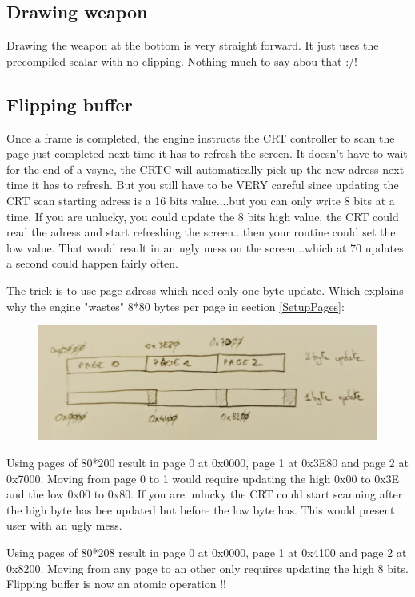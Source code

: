 \subsection{Drawing weapon}
Drawing the weapon at the bottom is very straight forward. It just uses the precompiled scalar with no clipping. Nothing much to say abou that :/!\\






\subsection{Flipping buffer} \label{Flippingbuffer}
Once a frame is completed, the engine instructs the CRT controller to scan the page just completed next time it has to refresh the screen. It doesn't have to wait for the end of a vsync, the CRTC will automatically pick up the new adress next time it has to refresh. But you still have to be VERY careful since updating the CRT scan starting adress is a 16 bits value....but you can only write 8 bits at a time. If you are unlucky, you could update the 8 bits high value, the CRT could read the adress and start refreshing the screen...then your routine could set the low value. That would result in an ugly mess on the screen...which at 70 updates a second could happen fairly often.\\
\par
The trick is to use page adress which need only one byte update. Which explains why the engine "wastes" 8*80 bytes per page in section \ref{SetupPages}:\\
\par
\begin{figure}[H]
 \centering
 \includegraphics[width=\textwidth]{imgs/triple_pages_trick.png}
\end{figure}
\par
Using pages of 80*200 result in page 0 at 0x0000, page 1 at 0x3E80 and page 2 at 0x7000. Moving from page 0 to 1 would require updating the high 0x00 to 0x3E and the low 0x00 to 0x80. If you are unlucky the CRT could start scanning after the high byte has bee updated but before the low byte has. This would present user with an ugly mess.\\
\par
Using pages of 80*208 result in page 0 at 0x0000, page 1 at 0x4100 and page 2 at 0x8200. Moving from any page to an other only requires updating the high 8 bits. Flipping buffer is now an atomic operation !!\\





